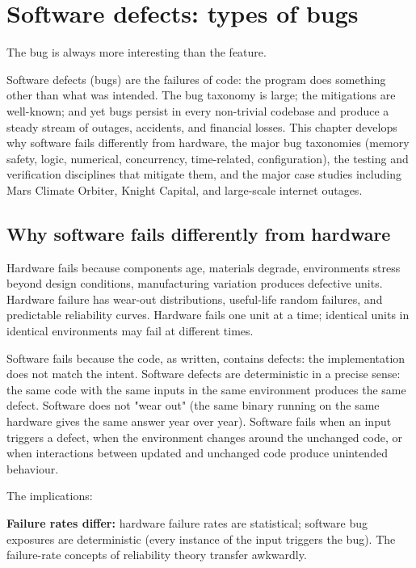 \chapter{Software defects: types of bugs}
\label{vol10:ch05}

\epigraph{The bug is always more interesting than the feature.}{}


\noindent
Software defects (bugs) are the failures of code: the program does something other than what was intended. The bug taxonomy is large; the mitigations are well-known; and yet bugs persist in every non-trivial codebase and produce a steady stream of outages, accidents, and financial losses. This chapter develops why software fails differently from hardware, the major bug taxonomies (memory safety, logic, numerical, concurrency, time-related, configuration), the testing and verification disciplines that mitigate them, and the major case studies including Mars Climate Orbiter, Knight Capital, and large-scale internet outages.

\section{Why software fails differently from hardware}

Hardware fails because components age, materials degrade, environments stress beyond design conditions, manufacturing variation produces defective units. Hardware failure has wear-out distributions, useful-life random failures, and predictable reliability curves. Hardware fails one unit at a time; identical units in identical environments may fail at different times.

Software fails because the code, as written, contains defects: the implementation does not match the intent. Software defects are deterministic in a precise sense: the same code with the same inputs in the same environment produces the same defect. Software does not "wear out" (the same binary running on the same hardware gives the same answer year over year). Software fails when an input triggers a defect, when the environment changes around the unchanged code, or when interactions between updated and unchanged code produce unintended behaviour.

The implications:

\textbf{Failure rates differ:} hardware failure rates are statistical; software bug exposures are deterministic (every instance of the input triggers the bug). The failure-rate concepts of reliability theory transfer awkwardly.

